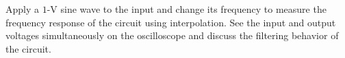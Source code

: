 \documentclass[11pt]{article}
\begin{document}
\begin{question}
    \begin{subquestion}{Apply a $1$-V sine wave to the input and change its frequency to measure the frequency response of the circuit using interpolation. See the input and output voltages simultaneously on the oscilloscope and discuss the filtering behavior of the circuit.}
\end{subquestion}
\end{question}
\end{document}
